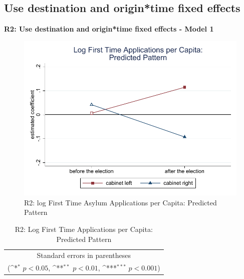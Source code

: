 \documentclass[10pt,a4paper]{scrartcl}
\begin{document}

\FloatBarrier
\clearpage
\subsection{Use destination and origin*time fixed effects}
\textbf{R2: Use destination and origin*time fixed effects - Model 1}

\begin{figure}[!ht]
	\centering
	\includegraphics[width=1\textwidth]{figures_edited/app_graph1_R2.pdf}
	\caption{R2: log First Time Asylum Applications per Capita: Predicted Pattern}
\end{figure}

\begin{table}[!ht]\centering
	\renewcommand{\arraystretch}{1.25}
	\def\sym#1{\ifmmode^{#1}\else\(^{#1}\)\fi}
	\caption{R2: Log First Time Applications per Capita: Predicted Pattern}
	\begin{tabular}{l*{2}{c}}
		\hline\hline
		
		\hline\hline
		\multicolumn{3}{c}{\footnotesize Standard errors in parentheses} \\
		\multicolumn{3}{c}{\footnotesize (\sym{*} \(p<0.05\), \sym{**} \(p<0.01\), \sym{***} \(p<0.001\))}\\
	\end{tabular}
\end{table}
\end{document}
